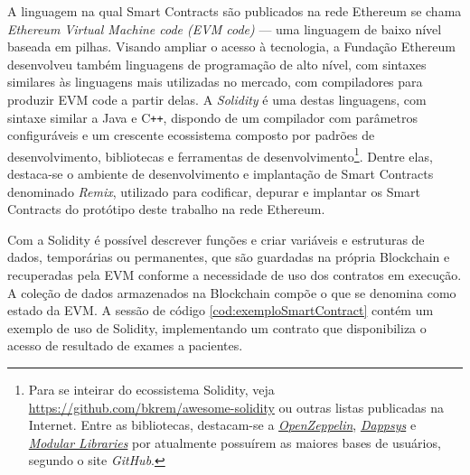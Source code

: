 \documentclass[a4paper,11pt]{article}
\begin{document}

A linguagem na qual Smart Contracts são publicados na rede Ethereum se chama \emph{Ethereum Virtual Machine code (EVM code)} --- uma linguagem de baixo nível baseada em pilhas. %
Visando ampliar o acesso à tecnologia, a Fundação Ethereum desenvolveu também linguagens de programação de alto nível, com sintaxes similares às linguagens mais utilizadas no mercado, com compiladores para produzir EVM code a partir delas. A \emph{Solidity} é uma destas linguagens, com sintaxe similar a Java e C\texttt{++}, dispondo de um compilador com parâmetros configuráveis e um crescente ecossistema composto por padrões de desenvolvimento, bibliotecas e ferramentas de desenvolvimento\footnote{Para se inteirar do ecossistema Solidity, veja \href{https://github.com/bkrem/awesome-solidity}{https://github.com/bkrem/awesome-solidity} ou outras listas publicadas na Internet. Entre as bibliotecas, destacam-se a \emph{\href{https://openzeppelin.com/}{OpenZeppelin}}, \emph{\href{https://github.com/dapphub/dappsys}{Dappsys}} e \emph{\href{https://github.com/modular-network/ethereum-libraries}{Modular Libraries}} por atualmente possuírem as maiores bases de usuários, segundo o site \emph{GitHub}.}. Dentre elas, destaca-se o ambiente de desenvolvimento e implantação de Smart Contracts denominado \emph{Remix}, utilizado para codificar, depurar e implantar os Smart Contracts do protótipo deste trabalho na rede Ethereum.


Com a Solidity é possível descrever funções e criar variáveis e estruturas de dados, temporárias ou permanentes, que são guardadas na própria Blockchain e recuperadas pela EVM conforme a necessidade de uso dos contratos em execução.
A coleção de dados armazenados na Blockchain compõe o que se denomina como estado da EVM.
A sessão de código \ref{cod:exemploSmartContract} contém um exemplo de uso de Solidity, implementando um contrato que disponibiliza o acesso de resultado de exames a pacientes.
\end{document}
